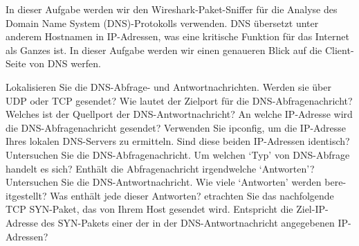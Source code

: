 \Aufgabenstellung%
In dieser Aufgabe werden wir den Wireshark-Paket-Sniffer für die Analyse des Domain
Name System (DNS)-Protokolls verwenden. DNS übersetzt unter anderem Hostnamen
in IP-Adressen, was eine kritische Funktion für das Internet als Ganzes ist. In dieser
Aufgabe werden wir einen genaueren Blick auf die Client-Seite von DNS werfen.

\Teilaufgabe%
Lokalisieren Sie die DNS-Abfrage- und Antwortnachrichten. Werden sie über UDP
oder TCP gesendet?
\Teilaufgabe%
Wie lautet der Zielport für die DNS-Abfragenachricht? Welches ist der Quellport
der DNS-Antwortnachricht?
\Teilaufgabe%
An welche IP-Adresse wird die DNS-Abfragenachricht gesendet? Verwenden Sie
ipconfig, um die IP-Adresse Ihres lokalen DNS-Servers zu ermitteln. Sind diese
beiden IP-Adressen identisch?
\Teilaufgabe%
Untersuchen Sie die DNS-Abfragenachricht. Um welchen `Typ' von DNS-Abfrage
handelt es sich? Enthält die Abfragenachricht irgendwelche `Antworten'?
\Teilaufgabe%
Untersuchen Sie die DNS-Antwortnachricht. Wie viele `Antworten' werden bere-
itgestellt? Was enthält jede dieser Antworten?
\Teilaufgabe%
etrachten Sie das nachfolgende TCP SYN-Paket, das von Ihrem Host gesendet
wird. Entspricht die Ziel-IP-Adresse des SYN-Pakets einer der in der DNS-Antwortnachricht
angegebenen IP-Adressen?